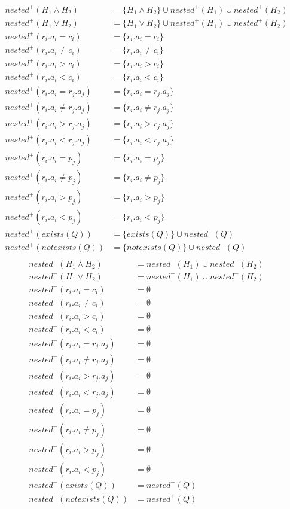 \begin{mydef}
	\begin{align*}
		nested^+(H_1\land H_2) & = \{H_1 \land H_2\}  \cup nested^+(H_1) \cup nested^+(H_2) \\
		nested^+(H_1\lor H_2) & = \{H_1 \lor H_2\}  \cup nested^+(H_1) \cup nested^+(H_2) \\
		nested^+(r_i.a_i = c_i) & = \{r_i.a_i = c_i\} \\
		nested^+(r_i.a_i \neq c_i) & = \{r_i.a_i \neq c_i\} \\
		nested^+(r_i.a_i > c_i) & = \{r_i.a_i > c_i\} \\
		nested^+(r_i.a_i < c_i) & = \{r_i.a_i < c_i\} \\
		nested^+(r_i.a_i = r_j.a_j) & = \{r_i.a_i = r_j.a_j\} \\
		nested^+(r_i.a_i \neq r_j.a_j) & = \{r_i.a_i \neq r_j.a_j\} \\
		nested^+(r_i.a_i > r_j.a_j) & = \{r_i.a_i > r_j.a_j\} \\
		nested^+(r_i.a_i < r_j.a_j) & = \{r_i.a_i < r_j.a_j\} \\
		nested^+(r_i.a_i = p_j) & = \{r_i.a_i = p_j\} \\
		nested^+(r_i.a_i \neq p_j) & = \{r_i.a_i \neq p_j\} \\
		nested^+(r_i.a_i > p_j) & = \{r_i.a_i > p_j\} \\
		nested^+(r_i.a_i < p_j) & = \{r_i.a_i < p_j\} \\
		nested^+(exists(Q)) & = \{exists(Q)\} \cup nested^+(Q) \\
		nested^+(notexists(Q)) & = \{notexists(Q)\} \cup nested^-(Q) \\
	\end{align*}
	\begin{align*}
		nested^-(H_1\land H_2) & =nested^-(H_1) \cup nested^-(H_2) \\
		nested^-(H_1\lor H_2) & =  nested^-(H_1) \cup nested^-(H_2) \\
		nested^-(r_i.a_i = c_i) & = \emptyset \\
		nested^-(r_i.a_i \neq c_i) & = \emptyset \\
		nested^-(r_i.a_i > c_i) & = \emptyset \\
		nested^-(r_i.a_i < c_i) & = \emptyset \\
		nested^-(r_i.a_i = r_j.a_j) & = \emptyset \\
		nested^-(r_i.a_i \neq r_j.a_j) & = \emptyset \\
		nested^-(r_i.a_i > r_j.a_j) & = \emptyset \\
		nested^-(r_i.a_i < r_j.a_j) & = \emptyset \\
		nested^-(r_i.a_i = p_j) & = \emptyset \\
		nested^-(r_i.a_i \neq p_j) & = \emptyset \\
		nested^-(r_i.a_i > p_j) & = \emptyset \\
		nested^-(r_i.a_i < p_j) & = \emptyset \\
		nested^-(exists(Q)) & =nested^-(Q) \\
		nested^-(notexists(Q)) & = nested^+(Q) \\
	\end{align*}
	

\end{mydef}
